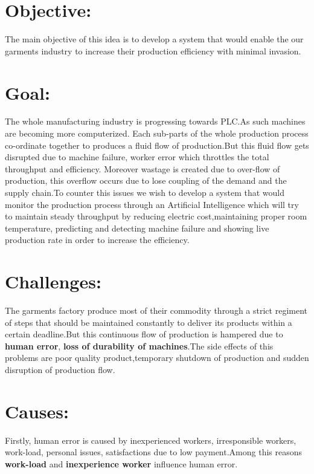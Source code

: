 \documentclass{article}
\begin{document}
    \begin{normalsize}
    
    	\section{Objective:}
        
        The main objective of this idea is to develop a system that would enable the our garments industry to increase their production efficiency with minimal invasion. 
           \section{Goal:}
        The whole manufacturing industry is progressing towards PLC.As such machines are becoming more computerized. Each sub-parts of the whole production process co-ordinate together to produces a fluid flow of production.But this fluid flow gets disrupted due to machine failure, worker error which throttles the total throughput and efficiency. Moreover wastage is created due to over-flow of production, this overflow occurs due to lose coupling of the demand and the supply chain.To counter this issues we wish to develop a system that would monitor the production process through an Artificial Intelligence which will try to maintain steady throughput by reducing electric cost,maintaining proper room temperature, predicting and detecting machine failure and showing live production rate in order to increase the efficiency.
  
      
		\section{Challenges:}
        
       The garments factory produce most of their commodity through a strict regiment of steps that should be maintained constantly to deliver its products within a certain deadline.But this continuous flow of production is hampered due to \textbf{ human error}, \textbf{ loss of durability of machines}.The side effects of this problems are poor quality product,temporary shutdown of production and sudden disruption of production flow.   
        
	   	\section{Causes:}
        
      Firstly, human error is caused by inexperienced workers, irresponsible workers, work-load, personal issues, satisfactions due to low payment.Among this reasons \textbf{work-load} and \textbf{inexperience worker} influence human error.
      

\end{normalsize}
\end{document}

